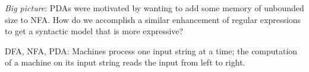\documentclass[12pt, oneside]{article}
\begin{document}

{\it Big picture}: PDAs were motivated by wanting to add some memory of unbounded size to NFA. How 
do we accomplish a similar enhancement of regular expressions to get a syntactic model that is 
more expressive?

DFA, NFA, PDA: Machines process one input string at a time; the computation of a machine on its input string 
reads the input from left to right.
\end{document}
